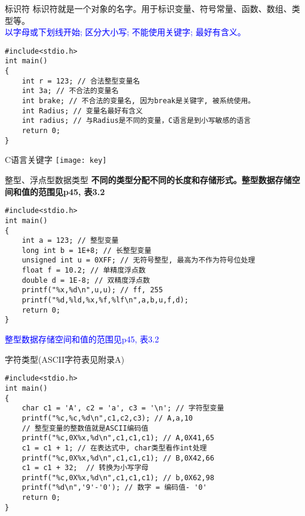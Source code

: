 \begin{frame}[fragile]{标识符}
标识符就是一个对象的名字。用于标识变量、符号常量、函数、数组、类型等。\\
\textcolor{blue}{以字母或下划线开始; 区分大小写; 不能使用关键字; 最好有含义。}
\begin{lstlisting}
#include<stdio.h>           
int main()                   
{                            
    int r = 123; // 合法整型变量名
    int 3a; // 不合法的变量名
    int brake; // 不合法的变量名, 因为break是关键字, 被系统使用。
    int Radius; // 变量名最好有含义
    int radius; // 与Radius是不同的变量，C语言是到小写敏感的语言
    return 0;           
}                            
\end{lstlisting}
\end{frame}

\begin{frame}{C语言关键字}
\texttt{[image: key]}
\end{frame}

\begin{frame}[fragile]{整型、浮点型数据类型}
\textbf{不同的类型分配不同的长度和存储形式。整型数据存储空间和值的范围见p45, 表3.2}
\begin{lstlisting}
#include<stdio.h>           
int main()                   
{                            
    int a = 123; // 整型变量
    long int b = 1E+8; // 长整型变量
    unsigned int u = 0XFF; // 无符号整型, 最高为不作为符号位处理
    float f = 10.2; // 单精度浮点数
    double d = 1E-8; // 双精度浮点数
    printf("%x,%d\n",u,u); // ff, 255
    printf("%d,%ld,%x,%f,%lf\n",a,b,u,f,d);
    return 0;           
}                            
\end{lstlisting}
\textcolor{blue}{整型数据存储空间和值的范围见p45, 表3.2}
\end{frame}

\begin{frame}[fragile]{字符类型(ASCII字符表见附录A)}
\begin{lstlisting}
#include<stdio.h>           
int main()                   
{                            
    char c1 = 'A', c2 = 'a', c3 = '\n'; // 字符型变量
    printf("%c,%c,%d\n",c1,c2,c3); // A,a,10
    // 整型变量的整数值就是ASCII编码值
    printf("%c,0X%x,%d\n",c1,c1,c1); // A,0X41,65
    c1 = c1 + 1; // 在表达式中, char类型看作int处理
    printf("%c,0X%x,%d\n",c1,c1,c1); // B,0X42,66
    c1 = c1 + 32;  // 转换为小写字母
    printf("%c,0X%x,%d\n",c1,c1,c1); // b,0X62,98
    printf("%d\n",'9'-'0'); // 数字 = 编码值- '0'
    return 0;           
}                            
\end{lstlisting}
\end{frame}

